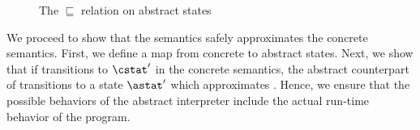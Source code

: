 \documentclass{LMCS}
\theoremstyle{definition} \newtheorem{property}[thm]{Property}
\begin{document}
\begin{figure}[!t]
  {\footnotesize
    {\renewcommand{\arraystretch}{1.7}
      }}
  \caption{The $\sqsubseteq$ relation on abstract states\label{fig:less-than}}
\end{figure}

We proceed to show that the \cfat{} semantics safely approximates the concrete
semantics.
First, we define a map \ctoa{\cdot} from concrete to abstract states.
Next, we show that if \cstat{} transitions to $\cstat'$ in the concrete
semantics, the abstract counterpart \ctoa{\cstat} of \cstat{} transitions to
a state $\astat'$ which approximates .
Hence, we ensure that the possible behaviors of the abstract interpreter include
the actual run-time behavior of the program.
\end{document}
